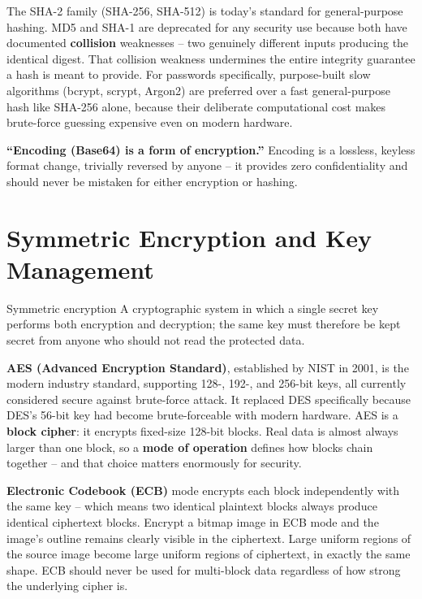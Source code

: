 The SHA-2 family (SHA-256, SHA-512) is today's standard for general-purpose hashing. MD5 and SHA-1
are deprecated for any security use because both have documented \textbf{collision} weaknesses --
two genuinely different inputs producing the identical digest. That collision
weakness undermines the entire integrity guarantee a hash is meant to provide. For passwords specifically, purpose-built slow
algorithms (bcrypt, scrypt, Argon2) are preferred over a fast general-purpose hash like SHA-256
alone, because their deliberate computational cost makes brute-force guessing expensive even on
modern hardware.

\begin{misconception}
\textbf{``Encoding (Base64) is a form of encryption.''} Encoding is a lossless, keyless format
change, trivially reversed by anyone -- it provides zero confidentiality and should never be
mistaken for either encryption or hashing.
\end{misconception}

\section{Symmetric Encryption and Key Management}

\begin{definition}{Symmetric encryption}
A cryptographic system in which a single secret key performs both encryption and decryption; the
same key must therefore be kept secret from anyone who should not read the protected data.
\end{definition}

\textbf{AES (Advanced Encryption Standard)}, established by NIST in 2001, is the modern industry
standard, supporting 128-, 192-, and 256-bit keys, all currently considered secure against
brute-force attack. It replaced DES specifically because DES's 56-bit key had become
brute-forceable with modern hardware. AES is a \textbf{block cipher}: it encrypts fixed-size 128-bit blocks.
Real data is almost always larger than one block, so a \textbf{mode of operation} defines how
blocks chain together -- and that choice matters enormously for security.

\begin{example}
\textbf{Electronic Codebook (ECB)} mode encrypts each block independently with the same key --
which means two identical plaintext blocks always produce identical ciphertext blocks. Encrypt a
bitmap image in ECB mode and the image's outline remains clearly visible in the ciphertext. Large
uniform regions of the source image become large uniform regions of ciphertext, in exactly the
same shape. ECB should never be used for multi-block data regardless of how strong the underlying
cipher is.
\end{example}


